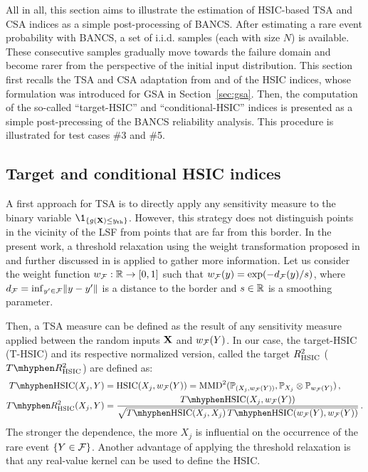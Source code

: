 All in all, this section aims to illustrate the estimation of HSIC-based TSA and CSA indices as a simple post-processing of BANCS. 
After estimating a rare event probability with BANCS, a set of i.i.d. samples (each with size $N$) is available. 
These consecutive samples gradually move towards the failure domain and become rarer from the perspective of the initial input distribution. 
This section first recalls the TSA and CSA adaptation from \citet{marrel_2018} and \citet{marrel_chabridon_2021} of the HSIC indices, whose formulation was introduced for GSA in Section~\ref{sec:gsa}.
Then, the computation of the so-called ``target-HSIC'' and ``conditional-HSIC'' indices is presented as a simple post-precessing of the BANCS reliability analysis. 
This procedure is illustrated for test cases \#3 and \#5. 


\subsection{Target and conditional HSIC indices}

A first approach for TSA is to directly apply any sensitivity measure to the binary variable $\1_{\{g(\bX) \leq \yth\}}$. 
However, this strategy does not distinguish points in the vicinity of the LSF from points that are far from this border. 
In the present work, a threshold relaxation using the weight transformation proposed in \citet{marrel_2018} and further discussed in \citet{marrel_chabridon_2021} is applied to gather more information. 
Let us consider the weight function $w_{\mathcal{F}}: \mathbb{R} \rightarrow [0, 1]$ such that $w_{\mathcal{F}}(y) = \exp(-d_{\mathcal{F}}(y)/s)$, where $d_{\mathcal{F}} = \mathrm{inf}_{y'\in \mathcal{F}} \Vert y -y' \Vert$ is a distance to the border and $s\in\mathbb{R}$ is a smoothing parameter. 

Then, a TSA measure can be defined as the result of any sensitivity measure applied between the random inputs ${\bf X}$ and $w_{\mathcal{F}}(Y)$. 
In our case, the target-HSIC (T-HSIC) and its respective normalized version, called the target $R^2_{\mathrm{HSIC}}$ ($T \mhyphen R^2_{\HSIC}$) are defined as: 
\begin{subequations}
    \begin{align}
        T \mhyphen \HSIC(X_j, Y) & = \HSIC(X_j, w_{\iF}(Y)) = \MMD^2(\P_{(X_j, w_{\iF}(Y))}, \P_{X_j} \otimes \P_{w_{\iF}(Y)})\, ,\\
        T \mhyphen R^2_{\HSIC}(X_j, Y) &= \frac{T \mhyphen \HSIC(X_j, w_{\iF}(Y))}{\sqrt{T \mhyphen \HSIC(X_j, X_j) \, T \mhyphen \HSIC(w_{\iF}(Y), w_{\iF}(Y))}}\, .
    \end{align}
\end{subequations}
The stronger the dependence, the more $X_j$ is influential on the occurrence of the rare event $\{Y\in\mathcal{F}\}$.  
Another advantage of applying the threshold relaxation is that any real-value kernel can be used to define the HSIC. 

